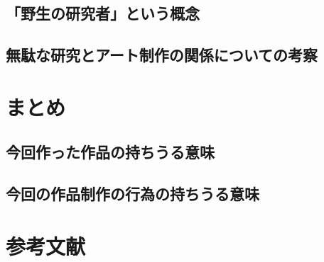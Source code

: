\section{「野生の研究者」という概念}\label{ux91ceux751fux306eux7814ux7a76ux8005ux3068ux3044ux3046ux6982ux5ff5}

\section{無駄な研究とアート制作の関係についての考察}\label{ux7121ux99c4ux306aux7814ux7a76ux3068ux30a2ux30fcux30c8ux5236ux4f5cux306eux95a2ux4fc2ux306bux3064ux3044ux3066ux306eux8003ux5bdf}

\chapter{まとめ}\label{ux307eux3068ux3081}

\section{今回作った作品の持ちうる意味}\label{ux4ecaux56deux4f5cux3063ux305fux4f5cux54c1ux306eux6301ux3061ux3046ux308bux610fux5473}

\section{今回の作品制作の行為の持ちうる意味}\label{ux4ecaux56deux306eux4f5cux54c1ux5236ux4f5cux306eux884cux70baux306eux6301ux3061ux3046ux308bux610fux5473}

\chapter{参考文献}\label{ux53c2ux8003ux6587ux732e}
